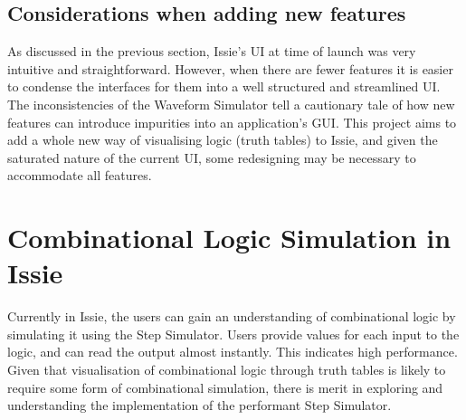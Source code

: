 \subsection{Considerations when adding new features}
As discussed in the previous section, Issie's UI at time of launch was very intuitive and straightforward. However, when there are fewer features it is easier to condense the interfaces for them into a well structured and streamlined UI. The inconsistencies of the Waveform Simulator tell a cautionary tale of how new features can introduce impurities into an application's GUI. This project aims to add a whole new way of visualising logic (truth tables) to Issie, and given the saturated nature of the current UI, some redesigning may be necessary to accommodate all features.

\section{Combinational Logic Simulation in Issie}
Currently in Issie, the users can gain an understanding of combinational logic by simulating it using the Step Simulator. Users provide values for each input to the logic, and can read the output almost instantly. This indicates high performance. Given that visualisation of combinational logic through truth tables is likely to require some form of combinational simulation, there is merit in exploring and understanding the implementation of the performant Step Simulator.

